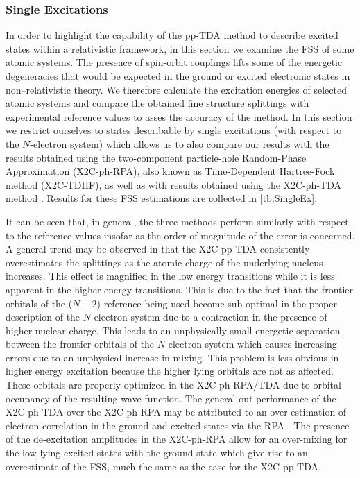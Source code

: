 \subsubsection{Single Excitations}
\label{subsec:SingleEx}
In order to highlight the capability of the pp-TDA method to describe excited
states within a relativistic framework, in this section we examine the FSS
of some atomic systems.  The presence of spin-orbit couplings 
lifts some of the energetic degeneracies that would be expected in the ground or
excited electronic states in non--relativistic theory.  
We therefore calculate the excitation energies of selected
atomic systems and compare the obtained fine structure splittings with
experimental reference values \cite{NIST_ASD} to asses the accuracy of the
method.  In this section we restrict ourselves to states describable by single
excitations (with respect to the $N$-electron system) which allows us to also
compare our results with the results obtained using the two-component
particle-hole Random-Phase Approximation (X2C-ph-RPA), also known as
Time-Dependent Hartree-Fock method (X2C-TDHF), as well as with results obtained
using the X2C-ph-TDA method \cite{Li16_3711}. Results for these FSS estimations 
are collected in \cref{tb:SingleEx}.

It can be seen that, in general, the three methods perform similarly with
respect to the reference values insofar as the order of magnitude of the error
is concerned. A general trend may be observed in that the X2C-pp-TDA
consistently overestimates the splittings as the atomic charge of the
underlying nucleus increases. This effect is magnified in the low energy
transitions while it is less apparent in the higher energy transitions. This is
due to the fact that the frontier orbitals of the ($N-2$)-reference being used
become sub-optimal in the proper description of the $N$-electron system due to
a contraction in the presence of higher nuclear charge. This leads to an
unphysically small energetic separation between the frontier orbitals of the
$N$-electron system which causes increasing errors due to an unphysical
increase in mixing. This problem is less obvious in higher energy excitation
because the higher lying orbitals are not as affected. These orbitals are
properly optimized in the X2C-ph-RPA/TDA due to orbital occupancy of the
resulting wave function. The general out-performance of the X2C-ph-TDA over the
X2C-ph-RPA may be attributed to an over estimation of electron correlation in
the ground and excited states via the RPA \cite{Dreuw05_4009}. The presence of
the de-excitation amplitudes in the X2C-ph-RPA allow for an over-mixing for the
low-lying excited states with the ground state which give rise to an
overestimate of the FSS, much the same as the case for the X2C-pp-TDA.
                                                                                                                                                 
